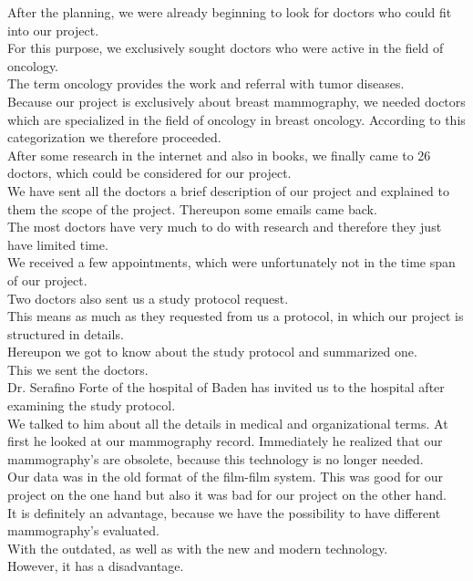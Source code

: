 After the planning, we were already beginning to look for doctors who could fit into our project. \\
For this purpose, we exclusively sought doctors who were active in the field of oncology. \\
The term oncology provides the work and referral with tumor diseases. \\
Because our project is exclusively about breast mammography, we needed doctors which are specialized in the field of oncology in breast oncology.  
According to this categorization we therefore proceeded.\\
After some research in the internet and also in books, we finally came to 26 doctors, which could be considered for our project. \\
We have sent all the doctors a brief description of our project and explained to them the scope of the project.  Thereupon some emails came back. \\
The most doctors have very much to do with research and therefore they just have limited time. \\
We received a few appointments, which were unfortunately not in the time span of our project. \\
Two doctors also sent us a study protocol request. \\
This means as much as they requested from us a protocol, in which our project is structured in details. \\
Hereupon we got to know about the study protocol and summarized one. \\
This we sent the doctors. \\
Dr. Serafino Forte of the hospital of Baden has invited us to the hospital after examining the study protocol. \\
We talked to him about all the details in medical and organizational terms. At first he looked at our mammography record. Immediately he realized that our mammography’s are obsolete, because this technology is no longer needed. \\
Our data was in the old format of the film-film system. This was good for our project on the one hand but also it was bad for our project on the other hand. \\
It is definitely an advantage, because we have the possibility to have different mammography’s evaluated. \\
With the outdated, as well as with the new and modern technology. \\
However, it has a disadvantage. \\
